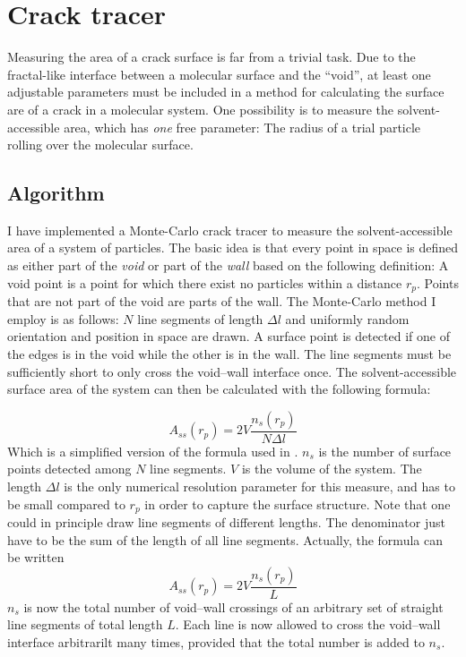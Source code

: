 \section{Crack tracer}
Measuring the area of a crack surface is far from a trivial task. Due to the fractal-like interface between a molecular surface and the ``void'', at least one adjustable parameters must be included in a method for calculating the surface are of a crack in a molecular system. One possibility is to measure the solvent-accessible area, which has \emph{one} free parameter: The radius of a trial particle rolling over the molecular surface. 


\subsection{Algorithm}
I have implemented a Monte-Carlo crack tracer to measure the solvent-accessible area of a system of particles. The basic idea is that every point in space is defined as either part of the \emph{void} or part of the \emph{wall} based on the following definition: A void point is a point for which there exist no particles within a distance $r_p$. Points that are not part of the void are parts of the wall. The Monte-Carlo method I employ is as follows: $N$ line segments of length $\Delta l$ and uniformly random orientation and position in space are drawn. A surface point is detected if one of the edges is in the void while the other is in the wall. The line segments must be sufficiently short to only cross the void--wall interface once. The solvent-accessible surface area of the system can then be calculated with the following formula:

\begin{equation}
A_{ss}(r_p) = 2V\frac{n_s(r_p)}{N\Delta l}
\label{eq:crack_tracer}
\end{equation}
Which is a simplified version of the formula used in \citet{Bhattacharya2009}. $n_s$ is the number of surface points detected among $N$ line segments. $V$ is the volume of the system. The length $\Delta l$ is the only numerical resolution parameter for this measure, and has to be small compared to $r_p$ in order to capture the surface structure. Note that one could in principle draw line segments of different lengths. The denominator just have to be the sum of the length of all line segments. Actually, the formula can be written
\begin{equation}
	A_{ss}(r_p) = 2V\frac{n_s(r_p)}{L}
\end{equation}
$n_s$ is now the total number of void--wall crossings of an arbitrary set of straight line segments of total length $L$. Each line is now allowed to cross the void--wall interface arbitrarilt many times, provided that the total number is added to $n_s$.

